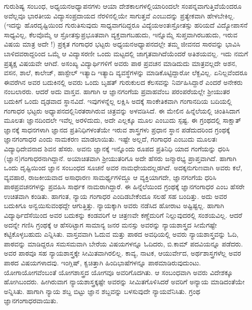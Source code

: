 {ಗುರು\enginline{-}ಶಿಷ್ಯ ಸಂಬಂಧ, ಅಧ್ಯಯನ\enginline{-}ಅಧ್ಯಾಪನಗಳು ಆಯಾ ದೇಶ\enginline{-}ಕಾಲಗಳಲ್ಲಿ\break ಯಾರಿಂದಲೇ ಸಂಪನ್ನವಾಗುತ್ತಿವೆಯೆಂದರೂ ಅವೆಲ್ಲವೂ ಭಾರತೀಯ ವಿದ್ಯಾ\break ಸಂಪ್ರದಾಯದ ನೆರಳಿನಲ್ಲಿಯೇ ಸಾಗುತ್ತವೆ ಎಂಬುದನ್ನು ಪ್ರತ್ಯೇಕವಾಗಿ ಹೇಳಬೇಕಿಲ್ಲ. (ಇದನ್ನು ಹೊರದೃಷ್ಟಿಯಿಂದ ಗುರುತಿಸುವುದು ಸಾಧ್ಯವಾಗದಿದ್ದರೂ ವಿದ್ಯೆಯ\break ಅಂತಃಸ್ರೋತಸ್ಸು ಹರಿಯದೆ ವಿದ್ಯೋಪಾಸನೆ ಸಾಧ್ಯವಿಲ್ಲ, ಕೆಲವೊಮ್ಮೆ ಆ ಸ್ರೋತಸ್ಸು\break ಪ್ರಭೂತವಾಗಿ ವ್ಯಕ್ತವಾಗಬಹುದು, ಇನ್ನೊಮ್ಮೆ ಸುಪ್ತವಾಗಿರಬಹುದು, ಇರುವ ವಿಷಯ ಮಾತ್ರ ಅದೇ !) ಪ್ರಕೃತ ಗಂಗಾಧರ ಭಟ್ಟರು ಅಧ್ಯಯನ\enginline{-}ಅಧ್ಯಾಪನದಲ್ಲೇ ತಮ್ಮ ಜೀವನದ ಸಾರವನ್ನು ಭಾವಿಸಿ ಬಾಳಿದವರಾದ್ದರಿಂದ ಒಮ್ಮೆ ಆ ವಿದ್ಯಾಸರಣೀ ಒಂದು ಮಟ್ಟದಲ್ಲಿ ಜಾಗೃತವಾಗಿದೆಯೆಂದರೆ ಅತಿಶಯವಲ್ಲ. ಇದು ನಮಗೆ ಪ್ರತ್ಯಕ್ಷ ವಿಷಯವೇ ಆಗಿದೆ. ಅಸಂಖ್ಯ ವಿದ್ಯಾರ್ಥಿಗಳಿಗೆ ಅವರು ಪಾಠ \enginline{-} ಪ್ರವಚನ ಮಾಡಿದುದು ಮಾತ್ರವಲ್ಲದೇ ಅಶನ, ವಸನ, ಶಾಲೆ, ಕಾಲೇಜ್, ಹಾಸ್ಟೇಲ್ ಇತ್ಯಾದಿ ಇತ್ಯಾದಿ ವ್ಯವಸ್ಥೆ\break ಗಳನ್ನು ಮಾಡಿಕೊಟ್ಟಿದ್ದಾರೋ ಲೆಕ್ಖವಿಲ್ಲ. ಏನಿಲ್ಲವೆಂದರೂ ಈವರೆಗಿನ ಅವರ ಬದುಕಿನಲ್ಲಿ ಅವರು ಒಂದು ಬೃಹತ್ ಗುರುಕುಲದ ಕೆಲಸವನ್ನು ನಿರ್ವಹಿಸಿದ್ದಾರೆ ಎಂದರೆ ಅನೇಕರು ನಂಬಲಾರರು. ಆದರೆ ಅದು ವಾಸ್ತವ. ಹಾಗಾಗಿ ಆ ಜ್ಞಾನಗಂಗೆಯ ಪ್ರವಾಹವೆಂಬ ಪರಂಪರೆಯಲ್ಲೇ ಶ್ರೀಯುತರ ಬದುಕಿಗೆ ಒಂದು ದೃಢವಾದ ಸ್ಥಾನವಿದೆ. ಇವುಗಳನ್ನೆಲ್ಲ ಲಕ್ಷಿಸಿ ಅದಕ್ಕೆ ಸಾಂಕೇತಿಕವಾಗಿ ಗಂಗಾನದಿಯ ಬದಿಯಲ್ಲಿ ಗಂಗಾಧರ ಭಟ್ಟರು ಅಧ್ಯಾಪನದಲ್ಲಿ\break ನಿರತರಾಗಿರುವ ಚಿತ್ರವನ್ನು ಅಳವಡಿಸಿದೆ. ಈ ಮೇಲಿನ ಹಿನ್ನೆಲೆಯಲ್ಲಿ ಚಿಂತಿಸಿದಾಗ ಮೂಲತಃ ಜ್ಞಾನದಿಂದಲೇ ಇವೆಲ್ಲ ಅರಳಿದುದು, ಅದೇ ಎಲ್ಲಕ್ಕೂ ಮೂಲ ಎಂಬುದು ಸ್ಪಷ್ಟ. ಈ ಗ್ರಂಥದಲ್ಲಿ ಸಾಕ್ಷಾತ್ ಜ್ಞಾನಕ್ಕೆ ಸಾಧನಗಳಾಗಿ ಜ್ಞಾನದ \hbox{ಪ್ರತಿನಿಧಿಗಳಂತೆಯೇ} ಇರುವ ಶಾಸ್ತ್ರಗಳು ಪ್ರಧಾನ ಸ್ಥಾನ ಪಡೆದುದರಿಂದ ಗ್ರಂಥಕ್ಕೆ ಜ್ಞಾನಗಂಗಾಧರ ಎಂದು ನಾಮಕರಣ ಮಾಡಲಾಯಿತು. ಇಷ್ಟೇ ಅಲ್ಲದೆ, ಗಂಗಾಧರ ಎಂಬುದು ಮೂಲತಃ \hbox{ವಿದ್ಯಾಧಿದೇವನಾದ} ಶಿವನ ಹೆಸರು. ಅವನು ಜ್ಞಾನಕ್ಕೆ ಇನ್ನೊಂದು ರೂಪದ \hbox{ಪ್ರತಿನಿಧಿ} ಯಾದ ಗಂಗೆಯನ್ನು ಧರಿಸಿ (ಜ್ಞಾನ)ಗಂಗಾಧರನಾಗಿದ್ದಾನೆ. \hbox{ಅಯಾಚಿತವಾಗಿ} ಶ್ರೀಯುತರಿಗೂ ಅದೇ ಹೆಸರು ಜನ್ಮಾರಭ್ಯ ಪ್ರಾಪ್ತವಾಗಿದೆ. ಹಾಗಾಗಿ ಒಂದು ದೃಷ್ಟಿಯಿಂದ ಜ್ಞಾನ ಸಂಬಂಧದ ಸೂಚನೆ ಅವರ ನಾಮಧೇಯದಲ್ಲಡಗಿದೆ. \hbox{ಅದಕ್ಕನುಗುಣವಾಗಿ} ಅವರು ಕಲೆ, ವ್ಯವಹಾರ, ರಾಜಕೀಯವಾದ ಅಸಾಧಾರಣ ಸಾಮರ್ಥ್ಯಗಳಿದ್ದೂ  ಆ \hbox{ವ್ಯಕ್ತಿಯಾಗದೇ}, ಜ್ಞಾನಗಂಗೆಯ ಧರಿಸಿ ಪಾಠ\enginline{-}ಪ್ರವಚನಗಳನ್ನು ಪ್ರವಹಿಸಿ ಸಾರ್ಥಕ \hbox{ನಾಮರಾಗಿದ್ದಾರೆ.} ಈ ಹಿನ್ನೆಲೆಯಿಂದ ಗ್ರಂಥಕ್ಕೆ ಜ್ಞಾನಗಂಗಾಧರ  ಎಂಬ ಹೆಸರೇ ಉಚಿತವಾಗಿ ಕಂಡಿತು. ಹಾಗಂತ, ನ್ಯಾಯ\- ಗಂಗಾಧರ ಎಂದಿಡಬೇಕೆಂದೂ  ಸಲಹೆ ಸಹ ಬಂದಿತ್ತು. ಅದು ಅವರ ಬದುಕಿಗೂ \hbox{ಅನ್ವಯಿಸುವಂಥದ್ದೇ} ಆಗುತ್ತಿತ್ತು. ನ್ಯಾಯಕ್ಕಾಗಿ ಅವರು ನಡೆಸಿದ ಹೋರಾಟ ಅಷ್ಟಿಷ್ಟಲ್ಲ. ಹಾಗಾಗಿ \hbox{ವಿದ್ಯಾರ್ಥಿದೆಸೆಯಿಂದ} ಅವರ ಬದುಕನ್ನು ಕಂಡವರಿಗೆ ಆ ಚಿತ್ರಣವೇ ಕಣ್ಣೆದುರಿಗೆ ನಿಲ್ಲುವುದರಲ್ಲಿ ಸಂಶಯವಿಲ್ಲ. ಆದರೆ ಅದನ್ನೇ ಗಣಿಸಿ ಗ್ರಂಥಕ್ಕೆ ಆ ಹೆಸರಿಟ್ಟಾಗ ಸಾಮಾನ್ಯ ಜನರ ಮನಸ್ಸು ಅವರನ್ನು ನ್ಯಾಯಶಾಸ್ತ್ರದ ಸೀಮೆಗಷ್ಟೇ ಕಟ್ಟಿಕೊಳ್ಳಬಹುದು ಎನ್ನಿಸಿತು. ವಾಸ್ತವವಾಗಿ ಓದುವ ಮತ್ತು ಪಾಠದ ಅವಧಿಯಲ್ಲಿ ಅವರು ನ್ಯಾಯಶಾಸ್ತ್ರವನ್ನು  ಓದಿ, ಪಾಠವನ್ನು \hbox{ಮಾಡಿದ್ದರೂ} ಸಮ\enginline{-}ಸಮವಾಗಿ ಬೇರೆಯ ವಿಷಯಗಳನ್ನೂ ಓದಿದರು, ಬಿ.ಕಾಮ್ ಪದವಿಯನ್ನೂ ಪಡೆದರು. ಅವರ ಪಾಠವೂ ಸಹ  ನ್ಯಾಯಶಾಸ್ತ್ರಕ್ಕೇ ಸೀಮಿತವಾಗಿರಲಿಲ್ಲ. ಕಾವ್ಯ, ನಾಟಕ, ಆಯುರ್ವೇದ, ಅರ್ಥಶಾಸ್ತ್ರಗಳೆಲ್ಲ ಅವರ ಪಾಠದ ವಿಷಯಗಳಾದವು. ಇಂಗ್ಲಿಷ್, ಕ್ವಚಿತ್ತಾಗಿ ಹಿಂದಿಭಾಷೆ\-ಗಳನ್ನೂ ಪಾಠಮಾಡಿರುವುದುಂಟು. ಯೋಗಾಯೋಗ\-ವೆಂಬಂತೆ ಯೋಗಶಾಸ್ತ್ರದ ಯೋಗವೂ ಅವರಿಗೊದಗಿತು. ಆ ಸಂಬಂಧವಾಗಿ ಅವರು ವಿದೇಶಕ್ಕೂ ಹೋಗಿ\-ಬಂದರು. ಹೀಗಿರುವಾಗ ನ್ಯಾಯಶಾಸ್ತ್ರಕ್ಕಷ್ಟೇ ಅವರನ್ನು ಸೀಮಿತಗೊಳಿಸಿದರೆ ಅವರಿಗೆ ಅನ್ಯಾಯ ಮಾಡಿದಂತೆಯೇ ಅನ್ನಿಸಿತು. ಹಾಗಾಗಿ ನ್ಯಾಯ ಶಬ್ದ ಬಿಟ್ಟು ಜ್ಞಾನ ಶಬ್ದವನ್ನು ಬಳಸುವುದೇ ನ್ಯಾಯವೆನಿಸಿತು. ಗ್ರಂಥ ಜ್ಞಾನಗಂಗಾಧರವಾಯಿತು.

}
